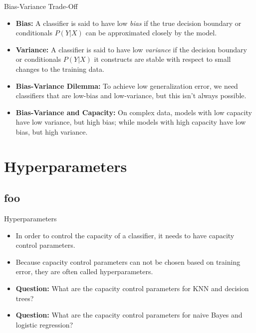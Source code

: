 \documentclass[serif,xcolor=pdftex,dvipsnames,table,hyperref={bookmarks=false}]{beamer}
\begin{document}
\begin{frame}[t]{Bias-Variance Trade-Off}

\begin{itemize}
\setlength{\itemsep}{12pt}

\item \textbf{Bias:} A classifier is said to have low \textit{bias} if the true decision boundary or conditionals $P(Y|X)$ can be approximated closely by the model.

\pause\item \textbf{Variance:} A classifier is said to have low \textit{variance} if the decision boundary or conditionals $P(Y|X)$ it constructs are stable with respect to small changes to the training data. 

\pause\item \textbf{Bias-Variance Dilemma:} To achieve low generalization error, we need classifiers that are low-bias and low-variance, but this isn't always possible. 

\pause\item \textbf{Bias-Variance and Capacity:} On complex data, models with low capacity have low variance, but high bias; while models with high capacity have low bias, but high variance. 
\end{itemize}
\end{frame}

\section{Hyperparameters}
\subsection{foo}

\begin{frame}[t]{Hyperparameters}

\begin{itemize}
\setlength{\itemsep}{12pt}

\item In order to control the capacity of a classifier, it needs to have capacity control parameters. 

\pause\item Because capacity control parameters can not be chosen based on training error, they are often called hyperparameters. 

\pause\item \textbf{Question:} What are the capacity control parameters for KNN and decision trees?

\pause\item \textbf{Question:} What are the capacity control parameters for naive Bayes and logistic regression? 

\end{itemize}
\end{frame}
\end{document}
